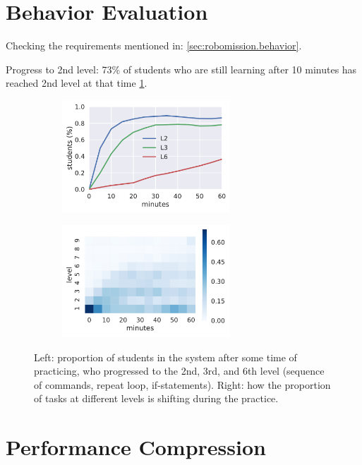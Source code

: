 \section{Behavior Evaluation}

Checking the requirements mentioned in: \cref{sec:robomission.behavior}.

Progress to 2nd level:
73\% of students who are still learning after 10 minutes has reached 2nd level at that time
\cref{fig:students-at-levels}.

\begin{figure}[htb]
\centering
\begin{subfigure}{.49\textwidth}
\centering
\includegraphics[height=42mm]{img/students-at-levels}
\end{subfigure}
\begin{subfigure}{.49\textwidth}
\centering
\includegraphics[height=42mm]{img/task-sessions-at-levels}
\end{subfigure}
\caption{%
  Left: proportion of students in the system after some time of practicing,
  who progressed to the 2nd, 3rd, and 6th level (sequence of commands, repeat loop, if-statements).
  Right: how the proportion of tasks at different levels is shifting during the practice.}
\label{fig:students-at-levels}
\end{figure}

\section{Performance Compression}

